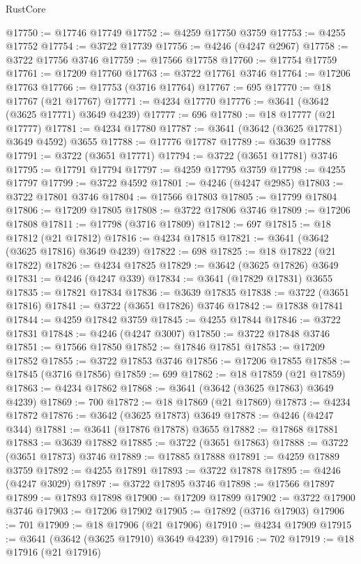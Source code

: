 \begin{lexlean}{RustCore}
\begin{coremodule}
@17750 := @17746 @17749
@17752 := @4259 @17750 @3759
@17753 := @4255 @17752
@17754 := @3722 @17739
@17756 := @4246 (@4247 @2967)
@17758 := @3722 @17756 @3746
@17759 := @17566 @17758
@17760 := @17754 @17759
@17761 := @17209 @17760
@17763 := @3722 @17761 @3746
@17764 := @17206 @17763
@17766 := @17753 (@3716 @17764)
@17767 := 695
@17770 := @18 @17767 (@21 @17767)
@17771 := @4234 @17770
@17776 := @3641 (@3642 (@3625 @17771) @3649 @4239)
@17777 := 696
@17780 := @18 @17777 (@21 @17777)
@17781 := @4234 @17780
@17787 := @3641 (@3642 (@3625 @17781) @3649 @4592) @3655
@17788 := @17776 @17787
@17789 := @3639 @17788
@17791 := @3722 (@3651 @17771)
@17794 := @3722 (@3651 @17781) @3746
@17795 := @17791 @17794
@17797 := @4259 @17795 @3759
@17798 := @4255 @17797
@17799 := @3722 @4592
@17801 := @4246 (@4247 @2985)
@17803 := @3722 @17801 @3746
@17804 := @17566 @17803
@17805 := @17799 @17804
@17806 := @17209 @17805
@17808 := @3722 @17806 @3746
@17809 := @17206 @17808
@17811 := @17798 (@3716 @17809)
@17812 := 697
@17815 := @18 @17812 (@21 @17812)
@17816 := @4234 @17815
@17821 := @3641 (@3642 (@3625 @17816) @3649 @4239)
@17822 := 698
@17825 := @18 @17822 (@21 @17822)
@17826 := @4234 @17825
@17829 := @3642 (@3625 @17826) @3649
@17831 := @4246 (@4247 @339)
@17834 := @3641 (@17829 @17831) @3655
@17835 := @17821 @17834
@17836 := @3639 @17835
@17838 := @3722 (@3651 @17816)
@17841 := @3722 (@3651 @17826) @3746
@17842 := @17838 @17841
@17844 := @4259 @17842 @3759
@17845 := @4255 @17844
@17846 := @3722 @17831
@17848 := @4246 (@4247 @3007)
@17850 := @3722 @17848 @3746
@17851 := @17566 @17850
@17852 := @17846 @17851
@17853 := @17209 @17852
@17855 := @3722 @17853 @3746
@17856 := @17206 @17855
@17858 := @17845 (@3716 @17856)
@17859 := 699
@17862 := @18 @17859 (@21 @17859)
@17863 := @4234 @17862
@17868 := @3641 (@3642 (@3625 @17863) @3649 @4239)
@17869 := 700
@17872 := @18 @17869 (@21 @17869)
@17873 := @4234 @17872
@17876 := @3642 (@3625 @17873) @3649
@17878 := @4246 (@4247 @344)
@17881 := @3641 (@17876 @17878) @3655
@17882 := @17868 @17881
@17883 := @3639 @17882
@17885 := @3722 (@3651 @17863)
@17888 := @3722 (@3651 @17873) @3746
@17889 := @17885 @17888
@17891 := @4259 @17889 @3759
@17892 := @4255 @17891
@17893 := @3722 @17878
@17895 := @4246 (@4247 @3029)
@17897 := @3722 @17895 @3746
@17898 := @17566 @17897
@17899 := @17893 @17898
@17900 := @17209 @17899
@17902 := @3722 @17900 @3746
@17903 := @17206 @17902
@17905 := @17892 (@3716 @17903)
@17906 := 701
@17909 := @18 @17906 (@21 @17906)
@17910 := @4234 @17909
@17915 := @3641 (@3642 (@3625 @17910) @3649 @4239)
@17916 := 702
@17919 := @18 @17916 (@21 @17916)

\end{coremodule}
\end{lexlean}
